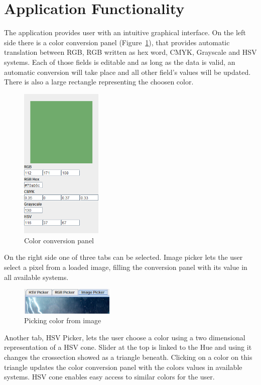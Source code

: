 \documentclass[titlepage]{article}
\begin{document}
\clearpage
\section{Application Functionality}
The application provides user with an intuitive graphical interface. On the left
side there is a color conversion panel (Figure~\ref{fig:conv}), that provides
automatic translation between RGB, RGB written as hex word, CMYK, Grayscale and
HSV systems. Each of those fields is editable and as long as the data is valid,
an automatic conversion will take place and all other field's values will be
updated. There is also a large rectangle representing the choosen color.

\begin{figure}[!htb]
	\centering
	\includegraphics[width=0.35\textwidth]{img/conversion.png} 
	\caption{Color conversion panel}
	\label{fig:conv}
\end{figure}

On the right side one of three tabs can be selected. Image picker lets the user
select a pixel from a loaded image, filling the conversion panel with its value
in all available systems.

\begin{figure}[!htb]
	\centering
	\includegraphics[width=0.4\textwidth]{img/imagepick.png}
	\caption{Picking color from image} 
	\label{fig:image}
\end{figure}

Another tab, HSV Picker, lets the user choose a color using a two dimensional
representation of a HSV cone. Slider at the top is linked to the Hue and using
it changes the crossection showed as a triangle beneath. Clicking on a color on
this triangle updates the color conversion panel with the colors values in
available systems. HSV cone enables easy access to similar colors for the user.
\end{document}
